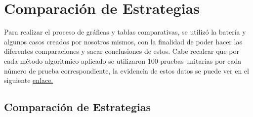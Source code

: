 \documentclass[letterpaper,10pt]{article}
\begin{document}
\section{Comparación de Estrategias}
\label{sec:comparacion_estrategias}

Para realizar el proceso de gráficas y tablas comparativas, se utilizó la batería y algunos casos creados por nosotros mismos, con la finalidad de poder hacer las diferentes comparaciones y sacar conclusiones de estos. Cabe recalcar que por cada método algoritmico aplicado se utilizaron 100 pruebas unitarias por cada número de prueba correspondiente, la evidencia de estos datos se puede ver en el siguiente \href{https://1drv.ms/x/s!Au19Z890RbcYgYp-EkAe5e8Z_uKeHA?e=RUO2BH}{enlace.}

\subsection{Comparación de Estrategias}
\end{document}
